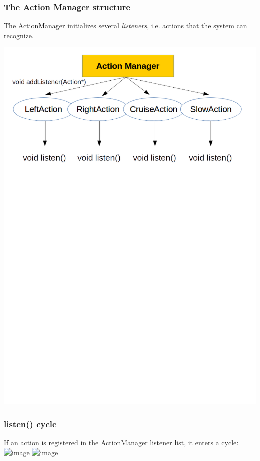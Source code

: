 \documentclass{beamer}
\begin{document}
\begin{frame}
\frametitle{The Action Manager structure}
The ActionManager initializes several \textit{listeners}, i.e. actions that the system can recognize.
\bigskip
\bigskip
\bigskip

\centering
\includegraphics[scale=0.5]{ActionManager}

\end{frame}

\begin{frame}
\frametitle{listen() cycle}
If an action is registered in the ActionManager listener list, it enters a cycle:\\

\centering
\includegraphics<1>[scale=0.6]{ListeningCycle3}
\includegraphics<2>[scale=0.4]{ListeningSignal}


\end{frame}
\end{document}
